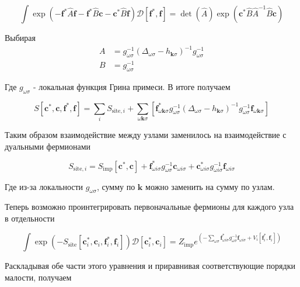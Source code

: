 \documentclass[11pt,a4paper]{report}
\begin{document}
\begin{equation}
 \int \exp{(-\mathbf{f}^*\hat{A}\mathbf{f}-\mathbf{f}^*\hat{B}\mathbf{c}-\mathbf{c}^*\hat{B}\mathbf{f})}\mathcal{D}[\mathbf{f}^*,\mathbf{f}] = \det{(\hat{A})}\exp{(\mathbf{c}^*\hat{B}\hat{A}^{-1}\hat{B}\mathbf{c})}
\end{equation}

Выбирая 
\begin{equation}
\begin{split}
 A &= g_{\omega\sigma}^{-1}(\Delta_{\omega\sigma}-h_{\mathbf{k}\sigma})^{-1} g_{\omega\sigma}^{-1} \\
 B &= g_{\omega\sigma}^{-1}
\end{split}
\end{equation}

Где $g_{\omega\sigma}$ - локальная функция Грина примеси. В итоге получаем

\begin{equation}
 S[\mathbf{c}^*,\mathbf{c},\mathbf{f}^*,\mathbf{f}] = \sum_i S_{\text{site},i} + \sum_{\omega\mathbf{k}\sigma}
 \left[\mathbf{f}^*_{\omega\mathbf{k}\sigma} g_{\omega\sigma}^{-1}(\Delta_{\omega\sigma}-h_{\mathbf{k}\sigma})^{-1} g_{\omega\sigma}^{-1}\mathbf{f}_{\omega\mathbf{k}\sigma}\right]
\end{equation}

Таким образом взаимодействие между узлами заменилось на взаимодействие с дуальными фермионами

\begin{equation}
 S_{\text{site},i} = S_{\text{imp}}[\mathbf{c}^*,\mathbf{c}] + \mathbf{f}^*_{\omega i\sigma} g_{\omega\sigma}^{-1}\mathbf{c}_{\omega i\sigma} + \mathbf{c}^*_{\omega i\sigma} g_{\omega i\sigma}^{-1}\mathbf{f}_{\omega i\sigma}
\end{equation}

Где из-за локальности $g_{\omega\sigma}$, сумму по $\mathbf{k}$ можно заменить на сумму по узлам.

Теперь возможно проинтегрировать первоначальные фермионы для каждого узла в отдельности

\begin{equation}
 \int \exp{(-S_{\text{site}}[\mathbf{c}^*_i,\mathbf{c}_i,\mathbf{f}^*_i,\mathbf{f}_i])}\mathcal{D}[\mathbf{c}^*_i,\mathbf{c}_i] = Z_{\text{imp}} e^{(-\sum_{\omega\sigma}\mathbf{f}^*_{\omega i\sigma}g_{\omega\sigma}^{-1}\mathbf{f}_{\omega i\sigma}+V_i[\mathbf{f}^*_i,\mathbf{f}_i])}
\end{equation}

Раскладывая обе части этого уравнения и приравнивая соответствующие порядки малости, получаем
\end{document}
